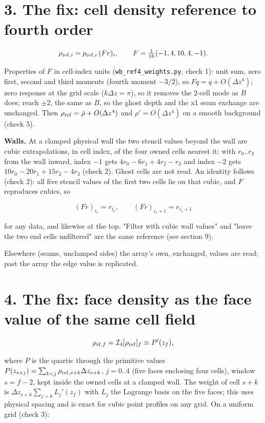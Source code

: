 \documentclass[11pt,a4paper]{article}
\begin{document}
\section*{3. The fix: cell density reference to fourth order}

\begin{equation*}
\rho_{{\rm ref},i} = p_{{\rm ref},i}\,(F r)_i, \qquad F = \tfrac1{16}(-1, 4, 10, 4, -1).
\end{equation*}

Properties of $F$ in cell-index units (\texttt{wb\_ref4\_weights.py}, check 1): unit sum, zero first, second and third
moments (fourth moment $-3/2$), so $Fq = q + O(\Delta z^4)$; zero response at the grid scale
($k\Delta z = \pi$), so it removes the 2-cell mode as $B$ does; reach $\pm2$, the same as $B$, so the ghost
depth and the x1 seam exchange are unchanged. Then $\rho_{\rm ref} = \bar\rho + O(\Delta z^4)$ and
$\rho' = O(\Delta z^4)$ on a smooth background (check 5).

\textbf{Walls.} At a clamped physical wall the two stencil values beyond the wall are cubic extrapolations, in cell
index, of the four owned cells nearest it: with $r_0..r_3$ from the wall inward, index $-1$ gets
$4r_0 - 6r_1 + 4r_2 - r_3$ and index $-2$ gets $10r_0 - 20r_1 + 15r_2 - 4r_3$ (check 2). Ghost cells are not
read. An identity follows (check 2): all five stencil values of the first two cells lie on that cubic, and
$F$ reproduces cubics, so

\begin{equation*}
(Fr)_{i_s} = r_{i_s}, \qquad (Fr)_{i_s+1} = r_{i_s+1}
\end{equation*}

for any data, and likewise at the top. "Filter with cubic wall values" and "leave the two end cells
unfiltered" are the same reference (see section 9).

Elsewhere (seams, unclamped sides) the array's own, exchanged, values are read; past the array the edge
value is replicated.

\section*{4. The fix: face density as the face value of the same cell field}

\begin{equation*}
\rho_{{\rm sf},f} = \mathcal I_4[\rho_{\rm ref}]_f \equiv P'(z_f),
\end{equation*}

where $P$ is the quartic through the primitive values $P(z_{s+j}) = \sum_{k<j}\rho_{{\rm ref},s+k}\Delta z_{s+k}$,
$j = 0..4$ (five faces enclosing four cells), window $s = f - 2$, kept inside the owned cells at a clamped
wall. The weight of cell $s+k$ is $\Delta z_{s+k}\sum_{j>k}L_j'(z_f)$ with $L_j$ the Lagrange basis on the five
faces; this uses physical spacing and is exact for cubic point profiles on any grid. On a uniform grid
(check 3):
\end{document}
